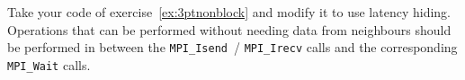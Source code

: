   \label{ex:3ptnonblock-hide}
  Take your code of exercise~\ref{ex:3ptnonblock} and modify it to use
  latency hiding. Operations that can be performed without needing
  data from neighbours should be performed in between the
  \lstinline{MPI_Isend}~/ \lstinline{MPI_Irecv} calls and the
  corresponding \lstinline{MPI_Wait} calls.

